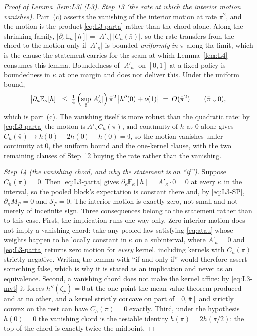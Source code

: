 \documentclass[11pt]{article}
\newcommand{\Eop}{\mathbb{E}}
\newcommand{\Akap}{A'_{\kappa}}
\begin{document}
\begin{proof}[Proof of Lemma~\ref{lem:L3} (L3)]
\emph{Step 13 (the rate at which the interior motion vanishes).} Part~(c) asserts the vanishing of
the interior motion at rate $\bar\pi^2$, and the motion is the product \eqref{eq:L3-parta} rather
than the chord alone. Along the shrinking family,
$\bigl|\partial_\kappa\Eop_\kappa[h]\bigr| = \lvert\Akap\rvert\,\lvert C_h(\bar\pi)\rvert$, so the
rate transfers from the chord to the motion only if $\lvert\Akap\rvert$ is bounded \emph{uniformly in
$\bar\pi$} along the limit, which is the clause the statement carries for the seam at which
Lemma~\ref{lem:L4} consumes this lemma. Boundedness of $\lvert\Akap\rvert$ on $[0,1]$ at a fixed
policy is boundedness in $\kappa$ at one margin and does not deliver this. Under the uniform bound,
\begin{equation}
\label{eq:L3-rate}
\bigl|\partial_\kappa\Eop_\kappa[h]\bigr|
 \;\le\; \tfrac14\,\Bigl(\sup_{\bar\pi}\lvert\Akap\rvert\Bigr)\,\bar\pi^2\,
   \bigl|h''(0)+o(1)\bigr| \;=\; O(\bar\pi^2)
 \qquad (\bar\pi \downarrow 0),
\end{equation}
which is part~(c). The vanishing itself is more robust than the quadratic rate: by
\eqref{eq:L3-parta} the motion is $\Akap C_h(\bar\pi)$, and continuity of $h$ at $0$ alone gives
$C_h(\bar\pi) \to h(0)-2h(0)+h(0) = 0$, so the motion vanishes under continuity at $0$, the uniform
bound and the one-kernel clause, with the two remaining clauses of Step~12 buying the rate rather
than the vanishing.

\emph{Step 14 (the vanishing chord, and why the statement is an ``if'').} Suppose
$C_h(\bar\pi) = 0$. Then \eqref{eq:L3-parta} gives $\partial_\kappa\Eop_\kappa[h] = \Akap\cdot 0 = 0$
at every $\kappa$ in the interval, so the pooled block's expectation is constant there and, by
\eqref{eq:L3-SP}, $\partial_\kappa M_P = 0$ and $\mathcal S_P = 0$. The interior motion is exactly
zero, not small and not merely of indefinite sign. Three consequences belong to the statement rather
than to this case. First, the implication runs one way only. Zero interior motion does not imply a
vanishing chord: take any pooled law satisfying \eqref{eq:atau} whose weights happen to be locally
constant in $\kappa$ on a subinterval, where $\Akap = 0$ and \eqref{eq:L3-parta} returns zero motion
for \emph{every} kernel, including kernels with $C_h(\bar\pi)$ strictly negative. Writing the lemma
with ``if and only if'' would therefore assert something false, which is why it is stated as an
implication and never as an equivalence. Second, a vanishing chord does not make the kernel affine:
by \eqref{eq:L3-mvt} it forces $h''(\zeta_{\bar\pi}) = 0$ at the one point the mean value theorem
produced and at no other, and a kernel strictly concave on part of $[0,\bar\pi]$ and strictly convex
on the rest can have $C_h(\bar\pi) = 0$ exactly. Third, under the hypothesis $h(0)=0$ the vanishing
chord is the testable identity $h(\bar\pi) = 2h(\bar\pi/2)$: the top of the chord is exactly twice
the midpoint.


\end{proof}
\end{document}
